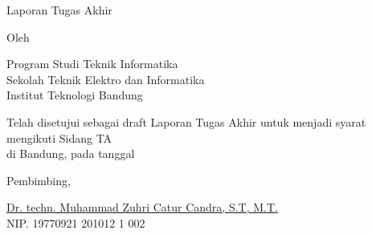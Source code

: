 \clearpage
\pagestyle{empty}

\begin{center}
	\smallskip

	\Large \bfseries \MakeUppercase{\thetitle}
	\vfill

	\Large Laporan Tugas Akhir
	\vfill

	\large Oleh

	\Large \theauthor

	\large Program Studi Teknik Informatika \\

	\normalsize \normalfont
	Sekolah Teknik Elektro dan Informatika \\
	Institut Teknologi Bandung \\

	\vfill
	\normalsize \normalfont

	Telah disetujui sebagai draft Laporan Tugas Akhir untuk menjadi syarat mengikuti Sidang TA \\
	di Bandung, pada tanggal \tanggalpengesahan

	\vspace{0.5cm}
	Pembimbing,

	\vfill
	\underline{Dr. techn. Muhammad Zuhri Catur Candra, S.T, M.T.
	} \\
	NIP. 19770921 201012 1 002

\end{center}
\clearpage
